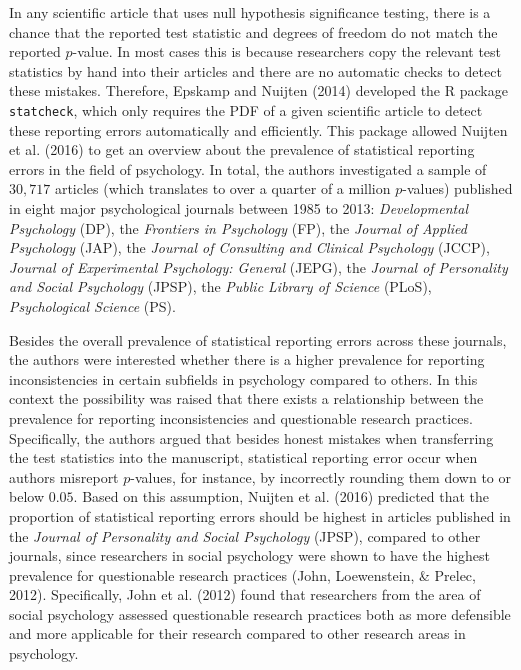 \documentclass[
  english,
  man,floatsintext]{apa6}
\begin{document}
In any scientific article that uses null hypothesis significance testing, there is a chance that the reported test statistic and degrees of freedom do not match the reported \(p\)-value. In most cases this is because researchers copy the relevant test statistics by hand into their articles and there are no automatic checks to detect these mistakes. Therefore, Epskamp and Nuijten (2014) developed the R package \texttt{statcheck}, which only requires the PDF of a given scientific article to detect these reporting errors automatically and efficiently. This package allowed Nuijten et al. (2016) to get an overview about the prevalence of statistical reporting errors in the field of psychology. In total, the authors investigated a sample of \(30{,}717\) articles (which translates to over a quarter of a million \(p\)-values) published in eight major psychological journals between 1985 to 2013: \emph{Developmental Psychology} (DP), the \emph{Frontiers in Psychology} (FP), the \emph{Journal of Applied Psychology} (JAP), the \emph{Journal of Consulting and Clinical Psychology} (JCCP), \emph{Journal of Experimental Psychology: General} (JEPG), the \emph{Journal of Personality and Social Psychology} (JPSP), the \emph{Public Library of Science} (PLoS), \emph{Psychological Science} (PS).

Besides the overall prevalence of statistical reporting errors across these journals, the authors were interested whether there is a higher prevalence for reporting inconsistencies in certain subfields in psychology compared to others. In this context the possibility was raised that there exists a relationship between the prevalence for reporting inconsistencies and questionable research practices. Specifically, the authors argued that besides honest mistakes when transferring the test statistics into the manuscript, statistical reporting error occur when authors misreport \(p\)-values, for instance, by incorrectly rounding them down to or below \(0.05\). Based on this assumption, Nuijten et al. (2016) predicted that the proportion of statistical reporting errors should be highest in articles published in the \emph{Journal of Personality and Social Psychology} (JPSP), compared to other journals, since researchers in social psychology were shown to have the highest prevalence for questionable research practices (John, Loewenstein, \& Prelec, 2012). Specifically, John et al. (2012) found that researchers from the area of social psychology assessed questionable research practices both as more defensible and more applicable for their research compared to other research areas in psychology.
\end{document}
